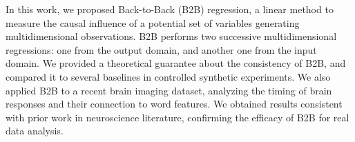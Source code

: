 In this work, we proposed Back-to-Back (B2B) regression, a linear method to
measure the causal influence of a potential set of variables generating multidimensional observations.
%
B2B performs two successive multidimensional regressions: one from the output domain, and another one from the input domain.
%
We provided a theoretical guarantee about the consistency of B2B, and compared it to several baselines in controlled synthetic experiments.
%
We also applied B2B to a recent brain imaging dataset, analyzing the timing
of brain responses and their connection to word features.
%
We obtained results consistent with prior work in neuroscience literature, confirming the efficacy of B2B for real data analysis.
%
